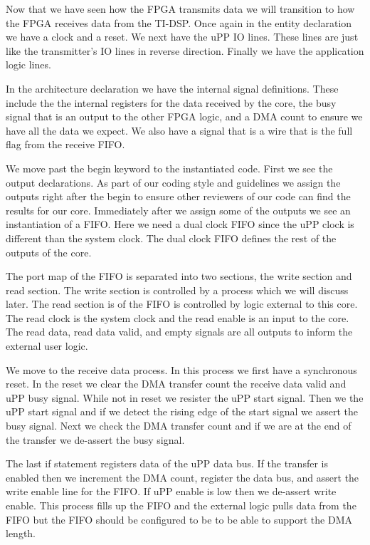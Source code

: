 Now that we have seen how the \ac{FPGA} transmits data we will transition to how the \ac{FPGA} receives data from the \ac{TI}-\ac{DSP}. Once again in the entity declaration we have a clock and a reset. We next have the \ac{uPP} \ac{IO} lines. These lines are just like the transmitter's \ac{IO} lines in reverse direction. Finally we have the application logic lines. 

In the architecture declaration we have the internal signal definitions. These include the the internal registers for the data received by the core, the busy signal that is an output to the other \ac{FPGA} logic, and a \ac{DMA} count to ensure we have all the data we expect. We also have a signal that is a wire that is the full flag from the receive \ac{FIFO}.

We move past the begin keyword to the instantiated code. First we see the output declarations. As part of our coding style and guidelines we assign the outputs right after the begin to ensure other reviewers of our code can find the results for our core. Immediately after we assign some of the outputs we see an instantiation of a \ac{FIFO}. Here we need a dual clock \ac{FIFO} since the \ac{uPP} clock is different than the system clock. The dual clock \ac{FIFO} defines the rest of the outputs of the core. 

The port map of the \ac{FIFO} is separated into two sections, the write section and read section. The write section is controlled by a process which we will discuss later. The read section is of the \ac{FIFO} is controlled by logic external to this core. The read clock is the system clock and the read enable is an input to the core. The read data, read data valid, and empty signals are all outputs to inform the external user logic. 

We move to the receive data process. In this process we first have a synchronous reset. In the reset we clear the \ac{DMA} transfer count the receive data valid and \ac{uPP} busy signal. While not in reset we resister the \ac{uPP} start signal. Then we  the \ac{uPP} start signal and if we detect the rising edge of the start signal we assert the busy signal. Next we check the \ac{DMA} transfer count and if we are at the end of the transfer we de-assert the busy signal. 

The last if statement registers data of the \ac{uPP} data bus. If the transfer is enabled then we increment the \ac{DMA} count, register the data bus, and assert the write enable line for the \ac{FIFO}. If \ac{uPP} enable is low then we de-assert write enable. This process fills up the \ac{FIFO} and the external logic pulls data from the \ac{FIFO} but the \ac{FIFO} should be configured to be to be able to support the \ac{DMA} length. 

